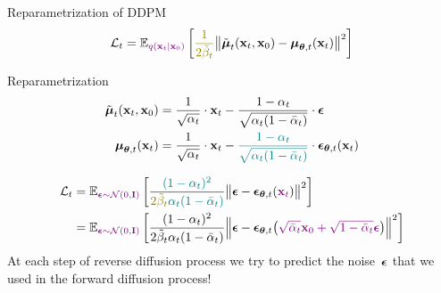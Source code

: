 \begin{frame}{Reparametrization of DDPM}
	\vspace{-0.3cm}
	\[
		\cL_t = \bbE_{\color{violet}q(\bx_t | \bx_0)} \left[ {\color{olive}\frac{1}{2\tilde{\beta}_t}} \bigl\| \tilde{\bmu}_t(\bx_t, \bx_0) - \bmu_{\btheta, t}(\bx_t) \bigr\|^2  \right]
	\]
	\vspace{-0.3cm}
	\begin{block}{Reparametrization}
		\vspace{-0.7cm}
		\begin{align*}
			\tilde{\boldsymbol{\mu}}_t(\mathbf{x}_t, \mathbf{x}_0) &= \frac{1}{\sqrt{\alpha_t}} \cdot \mathbf{x}_t - \frac{1 - \alpha_t}{\sqrt{\alpha_t (1 - \bar{\alpha}_t)}} \cdot \boldsymbol{\epsilon} \\
			\boldsymbol{\mu}_{\boldsymbol{\theta}, t}(\mathbf{x}_t) &= \frac{1}{\sqrt{\alpha_t}} \cdot \mathbf{x}_t - {\color{teal}\frac{1 - \alpha_t}{\sqrt{\alpha_t (1 - \bar{\alpha}_t)}}} \cdot \boldsymbol{\epsilon}_{\boldsymbol{\theta}, t}(\mathbf{x}_t)
		\end{align*}
		\vspace{-0.7cm}
	\end{block}
		\vspace{-0.5cm}
		\begin{align*}
			\cL_t &=  \bbE_{\color{violet} \bepsilon \sim \cN(0, \bI)} \left[ \frac{{\color{teal}(1 - \alpha_t)^2}}{{\color{olive}2\tilde{\beta}_t} {\color{teal} \alpha_t (1 - \bar{\alpha}_t)}} \bigl\| \bepsilon - \bepsilon_{\btheta, t}({\color{violet}\bx_t}) \bigr\|^2 \right] \\
			& =	 \bbE_{\color{violet}\bepsilon \sim \cN(0, \bI)} \left[ \frac{(1 - \alpha_t)^2}{2\tilde{\beta}_t \alpha_t (1 - \bar{\alpha}_t)} \Bigl\| \bepsilon - \bepsilon_{\btheta, t}\bigl( {\color{violet}\sqrt{\bar{\alpha}_t} \bx_0 + \sqrt{1 - \bar{\alpha}_t} \bepsilon}\bigr) \Bigr\|^2 \right]
		\end{align*}
		At each step of reverse diffusion process we try to predict the noise~$\boldsymbol{\epsilon}$ that we used in the forward diffusion process!
	\end{frame}
